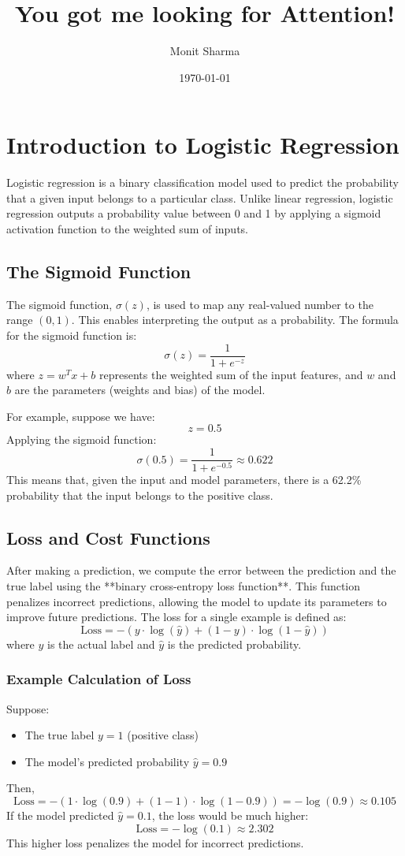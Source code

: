 \documentclass{article}
\title{You got me looking for Attention!}
\author{Monit Sharma}
\date{\today}
\begin{document}
\maketitle

\tableofcontents
\newpage

\section{Introduction to Logistic Regression}
Logistic regression is a binary classification model used to predict the probability that a given input belongs to a particular class. Unlike linear regression, logistic regression outputs a probability value between 0 and 1 by applying a sigmoid activation function to the weighted sum of inputs.

\subsection{The Sigmoid Function}
The sigmoid function, $\sigma(z)$, is used to map any real-valued number to the range $(0, 1)$. This enables interpreting the output as a probability. The formula for the sigmoid function is:
\[
\sigma(z) = \frac{1}{1 + e^{-z}}
\]
where $z = w^T x + b$ represents the weighted sum of the input features, and $w$ and $b$ are the parameters (weights and bias) of the model.

For example, suppose we have:
\[
z = 0.5
\]
Applying the sigmoid function:
\[
\sigma(0.5) = \frac{1}{1 + e^{-0.5}} \approx 0.622
\]
This means that, given the input and model parameters, there is a 62.2\% probability that the input belongs to the positive class.

\subsection{Loss and Cost Functions}
After making a prediction, we compute the error between the prediction and the true label using the **binary cross-entropy loss function**. This function penalizes incorrect predictions, allowing the model to update its parameters to improve future predictions. The loss for a single example is defined as:
\[
\text{Loss} = - \left( y \cdot \log(\hat{y}) + (1 - y) \cdot \log(1 - \hat{y}) \right)
\]
where $y$ is the actual label and $\hat{y}$ is the predicted probability.

\subsubsection{Example Calculation of Loss}
Suppose:
\begin{itemize}
    \item The true label $y = 1$ (positive class)
    \item The model's predicted probability $\hat{y} = 0.9$
\end{itemize}
Then,
\[
\text{Loss} = - \left( 1 \cdot \log(0.9) + (1 - 1) \cdot \log(1 - 0.9) \right) = -\log(0.9) \approx 0.105
\]
If the model predicted $\hat{y} = 0.1$, the loss would be much higher:
\[
\text{Loss} = -\log(0.1) \approx 2.302
\]
This higher loss penalizes the model for incorrect predictions.
\end{document}
